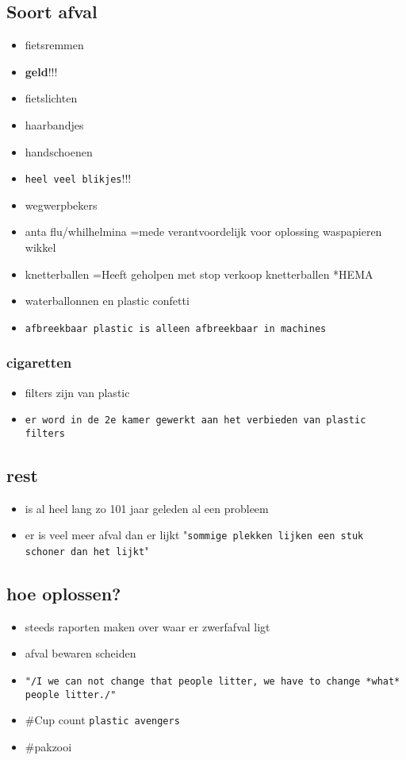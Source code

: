 \documentclass[11pt]{article}
\begin{document}
\subsection{Soort afval}
\label{sec:orgf4d7d2a}
\begin{itemize}
\item fietsremmen
\item \textbf{geld}!!!
\item fietslichten
\item haarbandjes
\item handschoenen
\item \texttt{heel veel blikjes}!!!
\item wegwerpbekers
\item anta flu/whilhelmina =mede verantvoordelijk voor oplossing waspapieren wikkel
\item knetterballen =Heeft geholpen met stop verkoop knetterballen *HEMA
\item waterballonnen en plastic confetti
\item \texttt{afbreekbaar plastic is alleen afbreekbaar in machines}
\end{itemize}
\subsubsection{cigaretten}
\label{sec:org5f40ec8}
\begin{itemize}
\item filters zijn van plastic
\item \texttt{er word in de 2e kamer gewerkt aan het verbieden van plastic filters}
\end{itemize}
\subsection{rest}
\label{sec:org3ea1012}
\begin{itemize}
\item is al heel lang zo 101 jaar geleden al een probleem
\item er is veel meer afval dan er lijkt "\texttt{sommige plekken lijken een stuk schoner dan het lijkt}"
\end{itemize}
\subsection{hoe oplossen?}
\label{sec:org5783f23}
\begin{itemize}
\item steeds raporten maken over waar er zwerfafval ligt
\item afval bewaren scheiden
\item \texttt{"/I we can not change that people litter, we have to change *what* people litter./"}
\item \#Cup count \texttt{plastic avengers}
\item \#pakzooi
\end{itemize}
\end{document}
